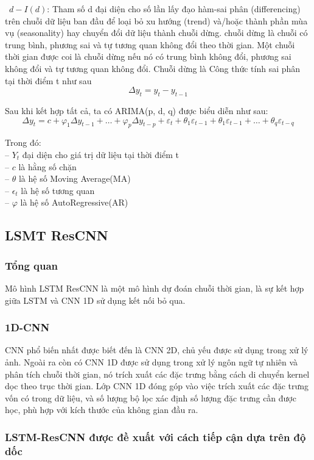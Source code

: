 \documentclass[conference]{IEEEtran}
\begin{document}
\indent\textbullet\  \(d-I(d)\): Tham số d đại diện cho số lần lấy đạo hàm-sai phân (differencing) trên chuỗi dữ liệu ban đầu để loại bỏ xu hướng (trend) và/hoặc thành phần mùa vụ (seasonality) hay chuyển đổi dữ liệu thành chuỗi dừng. chuỗi dừng là chuỗi có trung bình, phương sai và tự tương quan không đổi theo thời gian. Một chuỗi thời gian được coi là chuỗi dừng nếu nó có trung bình không đổi, phương sai không đổi và tự tương quan không đổi. Chuỗi dừng là Công thức tính sai phân tại thời điểm t như sau
\[
    \Delta y_t = y_t - y_{t-1}
\]

Sau khi kết hợp tất cả, ta có ARIMA(p, d, q) được biểu diễn như sau:
\[
    \Delta y_t = c + \varphi_1 \Delta y_{t-1} + \ldots + \varphi_p \Delta y_{t-p} + \varepsilon_t + \theta_1 \varepsilon_{t-1} + \theta_1 \varepsilon_{t-1} + \ldots + \theta_q \varepsilon_{t-q}
\]

Trong đó: \\
\indent -- \(Y_t\) đại diện cho giá trị dữ liệu tại thời điểm t\\
\indent -- \(c\) là hằng số chặn\\
\indent -- \(\theta\) là hệ số Moving Average(MA)\\
\indent -- \(\epsilon_t\) là hệ số tương quan\\
\indent -- \(\varphi\) là hệ số AutoRegressive(AR)\\

\subsection{LSMT ResCNN}
\subsubsection{Tổng quan}
Mô hình LSTM ResCNN là một mô hình dự đoán chuỗi thời gian, là sự kết hợp giữa LSTM và CNN 1D sử dụng kết nối bỏ qua.
\subsubsection{1D-CNN}
CNN phổ biến nhất được biết đến là CNN 2D, chủ yếu được sử dụng trong xử lý ảnh. Ngoài ra còn có CNN 1D được sử dụng trong xử lý ngôn ngữ tự nhiên và phân tích chuỗi thời gian, nó trích xuất các đặc trưng bằng cách di chuyển kernel dọc theo trục thời gian. Lớp CNN 1D đóng góp vào việc trích xuất các đặc trưng vốn có trong dữ liệu, và số lượng bộ lọc xác định số lượng đặc trưng cần được học, phù hợp với kích thước của không gian đầu ra.
\subsubsection{LSTM-ResCNN được đề xuất với cách tiếp cận dựa trên độ dốc}
\end{document}
